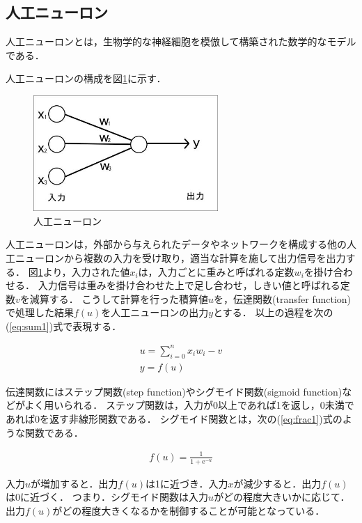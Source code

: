 \documentclass[a4j,12pt,dvipdfmx]{jreport}
\begin{document}
\subsection{人工ニューロン}
人工ニューロンとは，生物学的な神経細胞を模倣して構築された数学的なモデルである．

人工ニューロンの構成を図\ref{fig:neuron}に示す．

\begin{figure}[b]
  \centering
  \includegraphics[width=7cm]{image/neuron.png}
  \caption{人工ニューロン}
  \label{fig:neuron}
\end{figure}

人工ニューロンは，外部から与えられたデータやネットワークを構成する他の人工ニューロンから複数の入力を受け取り，適当な計算を施して出力信号を出力する．
図\ref{fig:neuron}より，入力された値$x_i$は，入力ごとに重みと呼ばれる定数$w_i$を掛け合わせる．
入力信号は重みを掛け合わせた上で足し合わせ，しきい値と呼ばれる定数$v$を減算する．
こうして計算を行った積算値$u$を，伝達関数(transfer function)で処理した結果$f(u)$を人工ニューロンの出力$y$とする．
以上の過程を次の(\ref{eq:sum1})式で表現する．


\begin{eqnarray}
  \label{eq:sum1}
  u = \sum_{i=0}^n x_i w_i - v \nonumber \\
  y = f(u)
\end{eqnarray}

伝達関数にはステップ関数(step function)やシグモイド関数(sigmoid function)などがよく用いられる．
ステップ関数は，入力が0以上であれば1を返し，0未満であれば0を返す非線形関数である．
シグモイド関数とは，次の(\ref{eq:frac1})式のような関数である．

\begin{eqnarray}
  \label{eq:frac1}
  f(u) = \frac{1}{1 + \mathrm{e}^{-u}}
\end{eqnarray}

入力$u$が増加すると．出力$f(u)$は1に近づき．入力$x$が減少すると．出力$f(u)$は0に近づく．
つまり．シグモイド関数は入力$u$がどの程度大きいかに応じて．出力$f(u)$がどの程度大きくなるかを制御することが可能となっている．
\end{document}
